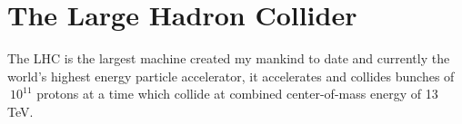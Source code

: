 \vspace{-3pt}
\section{The Large Hadron Collider}\label{sec:ch2:lhc}

The LHC is the largest machine created my mankind to date and currently the world's highest energy particle accelerator, it accelerates and collides bunches of $~10^{11}$ protons at a time which collide at combined center-of-mass energy of 13 TeV.

